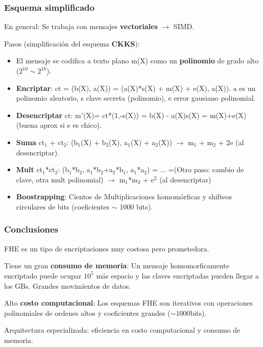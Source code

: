 \documentclass[10pt]{beamer}
\begin{document}
\begin{frame}
\frametitle{Esquema simplificado}
En general: Se trabaja con mensajes \textbf{vectoriales} $\to$ SIMD.
    \vspace{-0.3cm}

\pause
Pasos (simplificación del esquema \textbf{CKKS}):
\begin{itemize}
    \vspace{-0.3cm}
  \item El mensaje se codifica a texto plano m(X) como un \textbf{polinomio} de grado alto ($2^{10} \sim 2^{18}$).
\pause
    \vspace{-0.3cm}
  \item \textbf{Encriptar}: ct = (b(X), a(X)) = (a(X)*s(X) + m(X) + e(X), a(X)). a es un polinomio aleatorio, s clave secreta (polinomio), e error gausiano polinomial.
\pause
\vspace{-0.3cm}
  \item \textbf{Desencriptar} ct: m$'$(X)= ct*(1,-s(X)) = b(X) - a(X)s(X) = m(X)+e(X) (buena aprox si e es chico).
\pause
    \vspace{-0.3cm}
  \item \textbf{Suma} ct$_1$ + ct$_2$: (b$_1$(X) + b$_2$(X), a$_1$(X) + a$_2$(X)) $\to$ m$_1$ + m$_2$ + 2e (al desencriptar).
\pause
    \vspace{-0.3cm}
\item \textbf{Mult} ct$_1$*ct$_2$: (b$_1$*b$_2$, a$_1$*b$_2$+a$_2$*b$_1$, a$_1$*a$_2$) = ... =(Otro paso: cambio de clave, otra mult polinomial)
  $\to$ m$_1$*m$_2$ + e$^2$ (al desencriptar)
\pause
    \vspace{-0.3cm}
  \item \textbf{Boostrapping}: Cientos de Multiplicaciones homomórficas y shifteos circulares de bits (coeficientes $\sim$ 1000 bits).
\end{itemize}

\end{frame}


\begin{frame}
\frametitle{Conclusiones}
FHE es un tipo de encriptaciones muy costosa pero prometedora.


\pause
Tiene un gran \textbf{consumo de memoria}:
\pause
Un mensaje homomorficamente encriptado puede ocupar $10^5$ más espacio y las claves encriptadas pueden llegar a los GBs.
Grandes movimientos de datos.

\pause

Alto \textbf{costo computacional}:
\pause
  Los esquemas FHE son iterativos con operaciones polinomiales de ordenes altos y coeficientes grandes ($\sim 1000$bits).

\pause
\begin{mdframed}[backgroundcolor=frenchblue!20]
  Arquitectura especializada: eficiencia en costo computacional y consumo de memoria.
\end{mdframed}

\end{frame}
\end{document}
